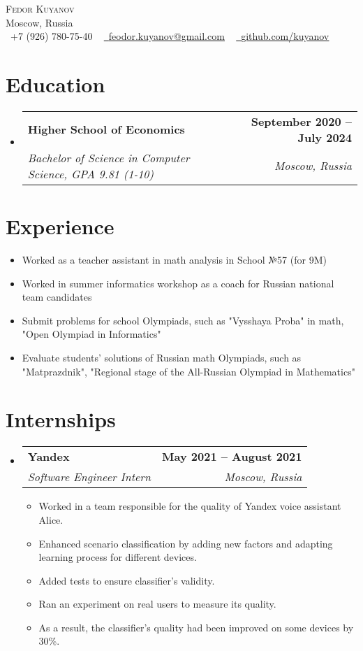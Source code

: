 \documentclass[letterpaper,11pt]{article}
\makeatletter
\newcommand{\resumeItem}[1]{
    \item\small{
        {#1 \vspace{-2pt}}
    }
}
\newcommand{\resumeSubheading}[4]{
    \vspace{-2pt}\item
    \begin{tabular*}{1.0\textwidth}[t]{l@{\extracolsep{\fill}}r}
        \textbf{#1} & \textbf{\small #2} \\
        \textit{\small#3} & \textit{\small #4} \\
    \end{tabular*}\vspace{-7pt}
}
\newcommand{\resumeSubItem}[1]{\resumeItem{#1}\vspace{-4pt}}
\newcommand{\resumeSubHeadingListStart}{\begin{itemize}[leftmargin=0.0in, label={}]}
\newcommand{\resumeSubHeadingListEnd}{\end{itemize}}
\newcommand{\resumeItemListStart}{\begin{itemize}}
\newcommand{\resumeItemListEnd}{\end{itemize}\vspace{-5pt}}
\makeatother
\begin{document}
\begin{center}
    {\Huge \scshape Fedor Kuyanov} \\ \vspace{3pt}
    Moscow, Russia \\ \vspace{5pt}
    \small \raisebox{-0.1\height}\faPhone\ +7 (926) 780-75-40 ~ \href{mailto:feodor.kuyanov@gmail.com}{\raisebox{-0.2\height}\faEnvelope\  \underline{feodor.kuyanov@gmail.com}} ~ 
    \href{https://github.com/kuyanov}{\raisebox{-0.2\height}\faGithub\ \underline{github.com/kuyanov}}
\end{center}


\vspace{-24pt}
\section{Education}
    \resumeSubHeadingListStart
    \resumeSubheading
        {Higher School of Economics}{September 2020 -- July 2024}
        {Bachelor of Science in Computer Science, GPA 9.81 (1-10)}{Moscow, Russia}
    \resumeSubHeadingListEnd


\section{Experience}
    \resumeItemListStart
        \resumeSubItem{Worked as a teacher assistant in math analysis in School №57 (for 9M)}
        \resumeSubItem{Worked in summer informatics workshop as a coach for Russian national team candidates}
        \resumeSubItem{Submit problems for school Olympiads, such as "Vysshaya Proba" in math, "Open Olympiad in Informatics"}
        \resumeSubItem{Evaluate students' solutions of Russian math Olympiads, such as "Matprazdnik", "Regional stage of the All-Russian Olympiad in Mathematics"}
    \resumeItemListEnd


\vspace{-8pt}
\section{Internships}
    \resumeSubHeadingListStart
    \resumeSubheading
        {Yandex}{May 2021 -- August 2021}
        {Software Engineer Intern}{Moscow, Russia}
    \resumeItemListStart
        \resumeItem{Worked in a team responsible for the quality of Yandex voice assistant Alice.}
        \resumeItem{Enhanced scenario classification by adding new factors and adapting learning process for different devices.}
        \resumeItem{Added tests to ensure classifier's validity.}
        \resumeItem{Ran an experiment on real users to measure its quality.}
        \resumeItem{As a result, the classifier's quality had been improved on some devices by 30\%.}
    \resumeItemListEnd
    \resumeSubHeadingListEnd
\end{document}
